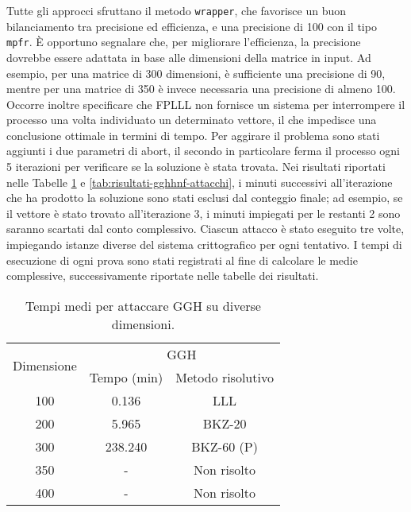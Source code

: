 Tutte gli approcci sfruttano il metodo \texttt{wrapper}, che favorisce un buon bilanciamento
tra precisione ed efficienza, e una precisione di 100 con il tipo \texttt{mpfr}. 
È opportuno segnalare che, per migliorare l'efficienza, la precisione dovrebbe essere 
adattata in base alle dimensioni della matrice in input. Ad esempio, per una 
matrice di 300 dimensioni, è sufficiente una precisione di 90, mentre per una matrice
di 350 è invece necessaria una precisione di almeno 100. Occorre inoltre specificare che
FPLLL non fornisce un sistema per interrompere il processo una volta individuato un 
determinato vettore, il che impedisce una conclusione ottimale in termini di tempo. 
Per aggirare il problema sono stati aggiunti i due parametri di abort, il secondo in particolare
ferma il processo ogni 5 iterazioni per verificare se la soluzione è stata trovata. 
Nei risultati riportati nelle Tabelle \ref{tab:risultati-ggh-attacchi} e 
\ref{tab:risultati-gghhnf-attacchi}, i minuti successivi all'iterazione che ha prodotto 
la soluzione sono stati esclusi dal conteggio finale; ad esempio, se il vettore è stato 
trovato all'iterazione 3, i minuti impiegati per le restanti 2 sono saranno scartati dal conto complessivo.  
Ciascun attacco è stato eseguito tre volte, impiegando istanze diverse del sistema 
crittografico per ogni tentativo. I tempi di esecuzione di ogni prova sono stati 
registrati al fine di calcolare le medie complessive, successivamente riportate nelle 
tabelle dei risultati.

\begin{table}[H]
    \centering
    \begin{tabular}{|c|c|c|}
    \hline
    \multirow{2}{*}{Dimensione} & \multicolumn{2}{c|}{GGH} \\
    \cline{2-3}
     & Tempo (min) & Metodo risolutivo\\
    \hline
    100 & 0.136 & LLL \\ 
    \hline
    200 & 5.965 &  BKZ-20 \\
    \hline
    300 &  238.240 & BKZ-60 (P) \\ 
    \hline
    350 & - & Non risolto \\
    \hline
    400 & - & Non risolto \\
    \hline
    \end{tabular}
    \caption{Tempi medi per attaccare GGH su diverse dimensioni.}
    \label{tab:risultati-ggh-attacchi}
\end{table}

